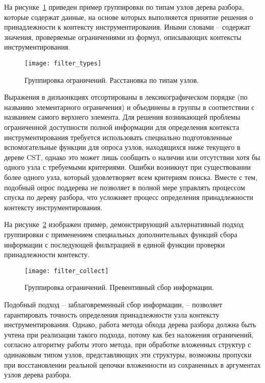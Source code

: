 На рисунке~\ref{fig:filter_types} приведен пример группировки по типам узлов дерева разбора, которые содержат данные, на основе которых выполняется принятие решения о принадлежности к контексту инструментирования. Иными словами -- содержат значения, проверяемые ограничениями из формул, описывающих контексты инструментирования.

\begin{figure}[!h]
	\centering
	\texttt{[image: filter\_types]}
	\caption{Группировка ограничений. Расстановка по типам узлов.}
	\label{fig:filter_types}
\end{figure}

Выражения в дизъюнкциях отсортированы в лексикографическом порядке (по названию элементарного ограничения) и объединены в группы в соответствии с названием самого верхнего элемента.
Для решения возникающей проблемы ограниченной доступности полной информации для определения контекста инструментирования требуется использовать специально подготовленные вспомогательные функции для опроса узлов, находящихся ниже текущего в дереве CST, однако это может лишь сообщить о наличии или отсутствии хотя бы одного узла с требуемыми критериями.
Ошибки возникнут при существовании более одного узла, который удовлетворяет всем критериям поиска.
Вместе с тем, подобный опрос поддерева не позволяет в полной мере управлять процессом спуска по дереву разбора, что усложняет процесс определения принадлежности контексту инструментирования.

На рисунке~\ref{fig:filter_collect} изображен пример, демонстрирующий альтернативный подход группировки с применением специальных дополнительных функций сбора информации с последующей фильтрацией в единой функции проверки принадлежности контексту.

\begin{figure}[!h]
	\centering
	\texttt{[image: filter\_collect]}
	\caption{Группировка ограничений. Превентивный сбор информации.}
	\label{fig:filter_collect}
\end{figure}

Подобный подход -- заблаговременный сбор информации, -- позволяет гарантировать точность определения принадлежности узла контексту инструментирования.
Однако, работа метода обхода дерева разбора должна быть учтена при реализации такого подхода, потому как без наложения ограничений, согласно алгоритму работы этого метода, при обработке вложенных структур с одинаковым типом узлов, представляющих эти структуры, возможны пропуски при восстановлении реальной цепочки вложенности из сохраненных в аргументах узлов дерева разбора.

